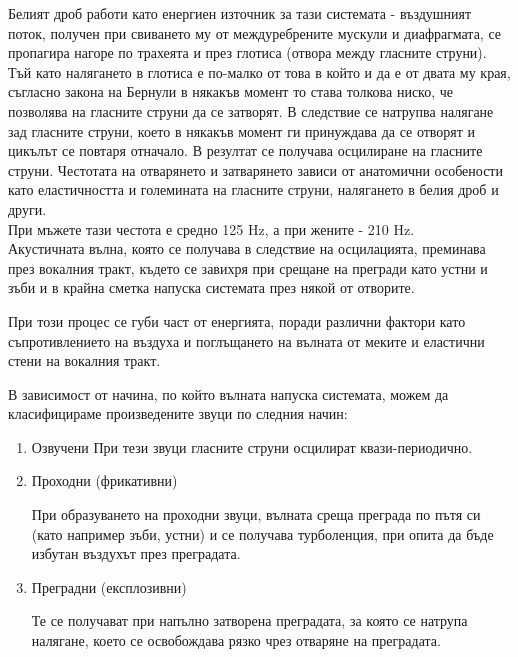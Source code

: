 \documentclass[main.tex]{subfiles}
\begin{document}
    Белият дроб работи като енергиен източник за тази системата - въздушният поток, получен при свиването му от междуребрените мускули и диафрагмата,
    се пропагира нагоре по трахеята и през глотиса (отвора между гласните струни).\\
    Тъй като налягането в глотиса е по-малко от това в който и да е от двата му края, съгласно закона на Бернули
    в някакъв момент то става толкова ниско, че позволява на гласните струни да се затворят. В следствие се натрупва налягане зад гласните струни, което в някакъв момент ги принуждава
    да се отворят и цикълът се повтаря отначало. В резултат се получава осцилиране на гласните струни. Честотата на отварянето и затварянето зависи от анатомични особености като еластичността и големината на
    гласните струни, налягането в белия дроб и други.\\
    При мъжете тази честота е средно 125 Hz, а при жените - 210 Hz.\\
    Акустичната вълна, която се получава в следствие на осцилацията,
    преминава през вокалния тракт, където се завихря при срещане на прегради като устни и зъби и в крайна сметка напуска системата през някой от отворите.

    При този процес се губи част от енергията, поради различни фактори като съпротивлението на въздуха и поглъщането на вълната от меките и еластични стени на вокалния тракт.

    В зависимост от начина, по който вълната напуска системата, можем да класифицираме произведените звуци по следния начин:

    \begin{enumerate}
        \item Озвучени
        При тези звуци гласните струни осцилират квази-периодично.
        
        \item Проходни (фрикативни) 
        
        При образуването на проходни звуци, вълната среща преграда по пътя си
        (като например зъби, устни) и се получава турболенция, при опита да бъде избутан въздухът през преградата.
        
        \item Преградни (експлозивни)
        
        Те се получават при напълно затворена преградата, за която се натрупа налягане, което се освобождава рязко чрез отваряне на преградата.
    \end{enumerate}
    
\end{document}
